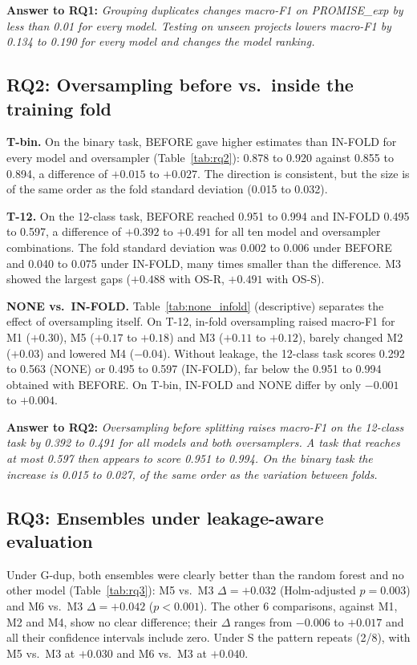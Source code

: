 \textbf{Answer to RQ1:} \emph{Grouping duplicates changes macro-F1 on PROMISE\_exp by less than 0.01 for every model. Testing on unseen projects lowers macro-F1 by 0.134 to 0.190 for every model and changes the model ranking.}

\subsection{RQ2: Oversampling before vs.\ inside the training fold}

\textbf{T-bin.} On the binary task, BEFORE gave higher estimates than IN-FOLD for every model and oversampler (Table~\ref{tab:rq2}): 0.878 to 0.920 against 0.855 to 0.894, a difference of $+0.015$ to $+0.027$. The direction is consistent, but the size is of the same order as the fold standard deviation (0.015 to 0.032).

\textbf{T-12.} On the 12-class task, BEFORE reached 0.951 to 0.994 and IN-FOLD 0.495 to 0.597, a difference of $+0.392$ to $+0.491$ for all ten model and oversampler combinations. The fold standard deviation was 0.002 to 0.006 under BEFORE and 0.040 to 0.075 under IN-FOLD, many times smaller than the difference. M3 showed the largest gaps ($+0.488$ with OS-R, $+0.491$ with OS-S).

\textbf{NONE vs.\ IN-FOLD.} Table~\ref{tab:none_infold} (descriptive) separates the effect of oversampling itself. On T-12, in-fold oversampling raised macro-F1 for M1 ($+0.30$), M5 ($+0.17$ to $+0.18$) and M3 ($+0.11$ to $+0.12$), barely changed M2 ($+0.03$) and lowered M4 ($-0.04$). Without leakage, the 12-class task scores 0.292 to 0.563 (NONE) or 0.495 to 0.597 (IN-FOLD), far below the 0.951 to 0.994 obtained with BEFORE. On T-bin, IN-FOLD and NONE differ by only $-0.001$ to $+0.004$.

\textbf{Answer to RQ2:} \emph{Oversampling before splitting raises macro-F1 on the 12-class task by 0.392 to 0.491 for all models and both oversamplers. A task that reaches at most 0.597 then appears to score 0.951 to 0.994. On the binary task the increase is 0.015 to 0.027, of the same order as the variation between folds.}

\subsection{RQ3: Ensembles under leakage-aware evaluation}


Under G-dup, both ensembles were clearly better than the random forest and no other model (Table~\ref{tab:rq3}): M5 vs.\ M3 $\Delta = +0.032$ (Holm-adjusted $p = 0.003$) and M6 vs.\ M3 $\Delta = +0.042$ ($p < 0.001$). The other 6 comparisons, against M1, M2 and M4, show no clear difference; their $\Delta$ ranges from $-0.006$ to $+0.017$ and all their confidence intervals include zero. Under S the pattern repeats (2/8), with M5 vs.\ M3 at $+0.030$ and M6 vs.\ M3 at $+0.040$.

